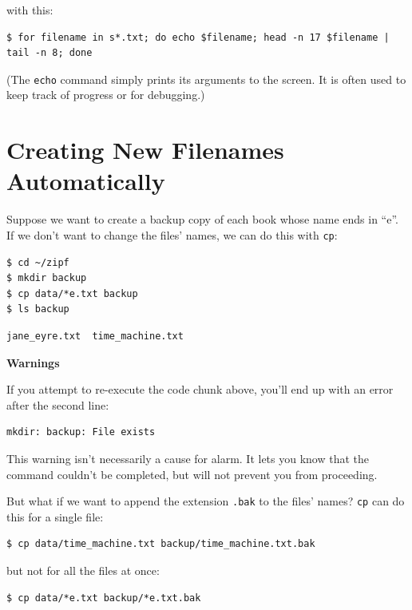 \documentclass[
]{krantz}
\renewenvironment{quote}{\begin{VF}}{\end{VF}}
\begin{document}
with this:

\begin{verbatim}
$ for filename in s*.txt; do echo $filename; head -n 17 $filename | tail -n 8; done
\end{verbatim}

(The \texttt{echo} command simply prints its arguments to the screen.
It is often used to keep track of progress or for debugging.)

\hypertarget{bash-tools-autoname}{%
\section{Creating New Filenames Automatically}\label{bash-tools-autoname}}

Suppose we want to create a backup copy of each book whose name ends in ``e''.
If we don't want to change the files' names,
we can do this with \texttt{cp}:

\begin{verbatim}
$ cd ~/zipf
$ mkdir backup
$ cp data/*e.txt backup
$ ls backup
\end{verbatim}

\begin{verbatim}
jane_eyre.txt  time_machine.txt
\end{verbatim}

\begin{quote}
\textbf{Warnings}

If you attempt to re-execute the code chunk above,
you'll end up with an error after the second line:

\begin{verbatim}
mkdir: backup: File exists
\end{verbatim}

This warning isn't necessarily a cause for alarm.
It lets you know that the command couldn't be completed,
but will not prevent you from proceeding.
\end{quote}

But what if we want to append the extension \texttt{.bak} to the files' names?
\texttt{cp} can do this for a single file:

\begin{verbatim}
$ cp data/time_machine.txt backup/time_machine.txt.bak
\end{verbatim}

but not for all the files at once:

\begin{verbatim}
$ cp data/*e.txt backup/*e.txt.bak
\end{verbatim}
\end{document}

